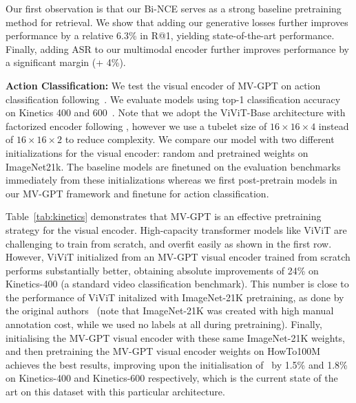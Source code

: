 \documentclass[10pt,twocolumn,letterpaper]{article}
\def\model{MV-GPT\xspace}
\begin{document}
Our first observation is that our Bi-NCE serves as a strong baseline pretraining method for retrieval. We show that adding our generative losses further improves performance by a relative 6.3\% in R@1, yielding state-of-the-art performance.
Finally, adding ASR to our multimodal encoder further improves performance by a significant margin (+ 4\%). 


\noindent\textbf{Action Classification:} 
We test the visual encoder of \model on action classification following~\cite{arnab2021vivit}.
We evaluate models using top-1 classification accuracy on Kinetics 400 and 600~\cite{kay2017kinetics}.
Note that we adopt the ViViT-Base architecture with factorized encoder following \cite{arnab2021vivit}, however we use a tubelet size of $16\times16\times4$ instead of $16\times16\times2$ to reduce complexity.
We compare our model with two different initializations for the visual encoder: random and pretrained weights on ImageNet21k.
The baseline models are finetuned on the evaluation benchmarks immediately from these initializations whereas we first post-pretrain models in our MV-GPT framework and finetune for action classification.


Table~\ref{tab:kinetics} demonstrates that MV-GPT is an effective pretraining strategy for the visual encoder.
High-capacity transformer models like ViViT are challenging to train from scratch, and overfit easily as shown in the first row.
However, ViViT initialized from an MV-GPT visual encoder trained from scratch performs substantially better, obtaining absolute improvements of 24\% on Kinetics-400 (a standard video classification benchmark).
This number is close to  the performance of ViViT initalized with ImageNet-21K pretraining, as done by the original authors~\cite{arnab2021vivit} (note that ImageNet-21K was created with high manual annotation cost, while we used no labels at all during pretraining).
Finally, initialising the MV-GPT visual encoder with these same ImageNet-21K weights, and then pretraining the MV-GPT visual encoder weights on HowTo100M achieves the best results, improving upon the initialisation of~\cite{arnab2021vivit} by 1.5\% and 1.8\% on Kinetics-400 and Kinetics-600 respectively, which is the current state of the art on this dataset with this particular architecture.
\end{document}
